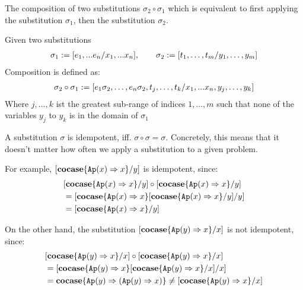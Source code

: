 \documentclass[twoside,12pt,a4paper]{article}
\begin{document}
The composition of two substitutions $\sigma_2 \circ \sigma_1$ which is equivalent to first applying the substitution $\sigma_1$, then the substitution $\sigma_2$.

\begin{definition}
    Given two substitutions
    \begin{align*}
        \sigma_1 := [e_1,...e_n/x_1,...x_n],\qquad \sigma_2 := [t_1,\dots,t_m/y_1,\dots,y_m]
    \end{align*}
    Composition is defined as:
    \begin{align*}
        \sigma_2\circ\sigma_1 := [e_1\sigma_2,\dots,e_n\sigma_2,t_j,\dots,t_k/x_1,...x_n,y_j,\dots,y_k]
    \end{align*}
    Where $j, \dots, k$ ist the greatest sub-range of indices $1,\dots,m$ such that none of the variables $y_j$ to $y_k$ is in the domain of $\sigma_1$ 
\end{definition}

\begin{definition}[Idempotency]
    A substitution $\sigma$ is idempotent, iff. $\sigma \circ \sigma = \sigma$.
    Concretely, this means that it doesn't matter how often we apply a substitution to a given problem.
\end{definition}

For example, $[\textbf{cocase}\{\texttt{Ap}(x)\Rightarrow x\} / y]$ is idempotent, since:
\begin{align*}
    &[\textbf{cocase}\{\texttt{Ap}(x)\Rightarrow x\} / y] \circ [\textbf{cocase}\{\texttt{Ap}(x)\Rightarrow x\} / y] \\
    &= [\textbf{cocase}\{\texttt{Ap}(x)\Rightarrow x\}[\textbf{cocase}\{\texttt{Ap}(x)\Rightarrow x\} / y] / y] \\
    &= [\textbf{cocase}\{\texttt{Ap}(x)\Rightarrow x\} / y] 
\end{align*}

On the other hand, the substitution $[\textbf{cocase}\{\texttt{Ap}(y)\Rightarrow x\} / x]$ is not idempotent, since:
\begin{align*}
    &[\textbf{cocase}\{\texttt{Ap}(y)\Rightarrow x\} / x] \circ [\textbf{cocase}\{\texttt{Ap}(y)\Rightarrow x\} / x]\\ 
    &= [\textbf{cocase}\{\texttt{Ap}(y)\Rightarrow x\}[\textbf{cocase}\{\texttt{Ap}(y)\Rightarrow x\} / x] / x] \\
    &= \textbf{cocase}\{\texttt{Ap}(y)\Rightarrow (\texttt{Ap}(y)\Rightarrow x) \} \neq [\textbf{cocase}\{\texttt{Ap}(y)\Rightarrow x\} / x]
\end{align*}
\end{document}
